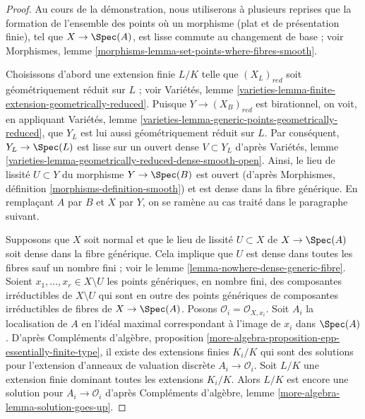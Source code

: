 \begin{proof}
Au cours de la démonstration, nous utiliserons à plusieurs reprises que la formation de l'ensemble des points
où un morphisme (plat et de présentation finie), tel que $X \to \Spec(A)$, est
lisse commute au changement de base ; voir
Morphismes, lemme \ref{morphisms-lemma-set-points-where-fibres-smooth}.

\medskip\noindent
Choisissons d'abord une extension finie $L/K$ telle que
$(X_L)_{red}$ soit géométriquement réduit sur $L$ ; voir
Variétés, lemme \ref{varieties-lemma-finite-extension-geometrically-reduced}.
Puisque $Y \to (X_B)_{red}$ est birationnel, on voit, en appliquant
Variétés, lemme \ref{varieties-lemma-generic-points-geometrically-reduced},
que $Y_L$ est lui aussi géométriquement réduit sur $L$.
Par conséquent, $Y_L \to \Spec(L)$ est lisse sur un ouvert dense $V \subset Y_L$ d'après
Variétés, lemme \ref{varieties-lemma-geometrically-reduced-dense-smooth-open}.
Ainsi, le lieu de lissité $U \subset Y$ du morphisme $Y \to \Spec(B)$
est ouvert (d'après Morphismes, définition \ref{morphisms-definition-smooth})
et est dense dans la fibre générique. En remplaçant $A$ par $B$ et $X$ par $Y$,
on se ramène au cas traité dans le paragraphe suivant.

\medskip\noindent
Supposons que $X$ soit normal et que le lieu de lissité $U \subset X$ de $X \to \Spec(A)$
soit dense dans la fibre générique. Cela implique que $U$ est dense dans toutes les fibres sauf
un nombre fini ; voir le lemme \ref{lemma-nowhere-dense-generic-fibre}.
Soient $x_1, \ldots, x_r \in X \setminus U$ les points génériques, en nombre fini,
des composantes irréductibles de $X \setminus U$ qui sont en outre
des points génériques de composantes irréductibles de fibres de $X \to \Spec(A)$.
Posons $\mathcal{O}_i = \mathcal{O}_{X, x_i}$. Soit $A_i$ la localisation de
$A$ en l'idéal maximal correspondant à l'image de $x_i$ dans $\Spec(A)$.
D'après
Compléments d'algèbre, proposition
\ref{more-algebra-proposition-epp-essentially-finite-type},
il existe des extensions finies
$K_i/K$ qui sont des solutions pour l'extension d'anneaux de valuation
discrète $A_i \to \mathcal{O}_i$. Soit $L/K$ une extension finie
dominant toutes les extensions $K_i/K$. Alors $L/K$
est encore une solution pour $A_i \to \mathcal{O}_i$ d'après
Compléments d'algèbre, lemme \ref{more-algebra-lemma-solution-goes-up}.


\end{proof}
